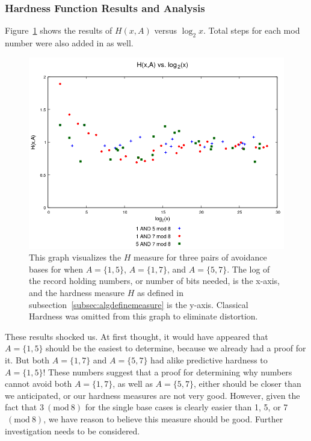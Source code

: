 \documentclass[12pt]{article}
\newcommand{\Mod}[1]{\ (\mathrm{mod}\ #1)}
\theoremstyle{definition}
\begin{document}
\subsubsection{Hardness Function Results and Analysis} \label{subsubsec:algmulhardness}
Figure~\ref{fig:h_multivslog} shows the results of $H(x,A)$ versus $\log_2{x}$. Total steps for each mod number were also added in as well.\par
\begin{figure}

    \centering
    \includegraphics[scale=0.75]{ModAvoidanceAnalysisPics/H_vs_log_multi_base.png}
    \caption{This graph visualizes the $H$ measure for three pairs of avoidance bases for when $A = \{1,5\}$, $A= \{1,7\}$, and $A = \{5,7\}$. The log of the record holding numbers, or number of bits needed, is the x-axis, and the hardness measure $H$ as defined in subsection~\ref{subsec:algdefinemeasure} is the y-axis. Classical Hardness was omitted from this graph to eliminate distortion.}
    \label{fig:h_multivslog}
\end{figure}
These results shocked us. At first thought, it would have appeared that $A = \{1, 5\}$ should be the easiest to determine, because we already had a proof for it. But both $A = \{1, 7\}$ and $A = \{5, 7\}$  had alike predictive hardness to $A = \{1, 5\}$! These numbers suggest that a proof for determining why numbers cannot avoid both $A = \{1, 7\}$, as well as $A = \{5, 7\}$, either should be closer than we anticipated, or our hardness measures are not very good. However, given the fact that $3\Mod{8}$ for the single base cases is clearly easier than 1, 5, or 7 $\Mod{8}$, we have reason to believe this measure should be good. Further investigation needs to be considered.
\end{document}
